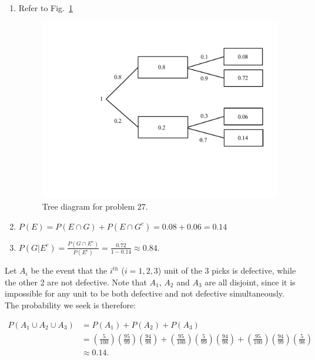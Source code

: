 \begin{problem}{27} $ $
\begin{enumerate}
\item Refer to Fig.~\ref{fig:prob_27}
	\begin{figure}[t]
	\centering
      		 \includegraphics[totalheight=6cm]{chpt1/tree_27.pdf}
  			  \caption{Tree diagram for problem 27.}
    			   \label{fig:prob_27}
	\end{figure}
	
	\item $P(E) = P(E \cap G) + P(E \cap G^c) = 0.08+0.06=0.14$
	
	\item $P(G|E^c) = \frac{P(G \cap E^c)}{P(E^c)} =  \frac{0.72}{1-0.14} \approx 0.84$. 
	
\end{enumerate}

\end{problem}


\begin{problem}{28} Let $A_i$ be the event that the $i^{th}$ ($i=1, 2, 3$) unit of the 3 picks is defective, while the other 2 are not defective.  Note that $A_1$, $A_2$ and $A_3$ are all disjoint, since it is impossible for any unit to be both defective and not defective simultaneously.  The probability we seek is therefore:

\begin{align*}
P(A_1 \cup A_2 \cup A_3) & = P(A_1)+P(A_2)+P(A_3) \\
&= \left(\frac{5}{100}\right)\left(\frac{95}{99}\right)\left(\frac{94}{98}\right) +\left(\frac{95}{100}\right)\left(\frac{5}{99}\right)\left(\frac{94}{98}\right)+\left(\frac{95}{100}\right)\left(\frac{94}{99}\right)\left(\frac{5}{98}\right) \\
&\approx 0.14.
\end{align*}


\end{problem}




